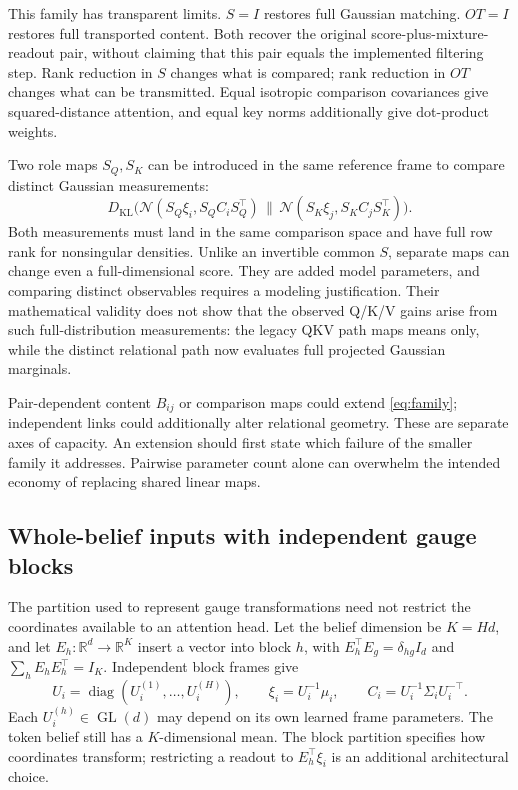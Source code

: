 \documentclass[11pt,letterpaper]{article}
\newcommand{\R}{\mathbb R}
\newcommand{\KL}{D_{\mathrm{KL}}}
\newcommand{\GL}{\operatorname{GL}}
\newcommand{\diag}{\operatorname{diag}}
\theoremstyle{remark}
\begin{document}
This family has transparent limits. $S=I$ restores full Gaussian matching. $OT=I$ restores full transported content. Both recover the original score-plus-mixture-readout pair, without claiming that this pair equals the implemented filtering step. Rank reduction in $S$ changes what is compared; rank reduction in $OT$ changes what can be transmitted. Equal isotropic comparison covariances give squared-distance attention, and equal key norms additionally give dot-product weights.

Two role maps $S_Q,S_K$ can be introduced in the same reference frame to compare distinct Gaussian measurements:
\begin{equation}
 \KL\big(\mathcal N(S_Q\xi_i,S_QC_iS_Q^\top)
 \,\|\,\mathcal N(S_K\xi_j,S_KC_jS_K^\top)\big).
 \label{eq:role-measure}
\end{equation}
Both measurements must land in the same comparison space and have full row rank for nonsingular densities. Unlike an invertible common $S$, separate maps can change even a full-dimensional score. They are added model parameters, and comparing distinct observables requires a modeling justification. Their mathematical validity does not show that the observed Q/K/V gains arise from such full-distribution measurements: the legacy QKV path maps means only, while the distinct relational path now evaluates full projected Gaussian marginals.

Pair-dependent content $B_{ij}$ or comparison maps could extend \eqref{eq:family}; independent links could additionally alter relational geometry. These are separate axes of capacity. An extension should first state which failure of the smaller family it addresses. Pairwise parameter count alone can overwhelm the intended economy of replacing shared linear maps.

\subsection{Whole-belief inputs with independent gauge blocks}
\label{sec:full-input-heads}
The partition used to represent gauge transformations need not restrict the coordinates available to an attention head. Let the belief dimension be $K=Hd$, and let $E_h:\R^d\to\R^K$ insert a vector into block $h$, with $E_h^\top E_g=\delta_{hg}I_d$ and $\sum_h E_hE_h^\top=I_K$. Independent block frames give
\begin{equation}
 U_i=\diag(U_i^{(1)},\ldots,U_i^{(H)}),\qquad
 \xi_i=U_i^{-1}\mu_i,\qquad C_i=U_i^{-1}\Sigma_iU_i^{-\top}.
\end{equation}
Each $U_i^{(h)}\in\GL(d)$ may depend on its own learned frame parameters. The token belief still has a $K$-dimensional mean. The block partition specifies how coordinates transform; restricting a readout to $E_h^\top\xi_i$ is an additional architectural choice.
\end{document}
